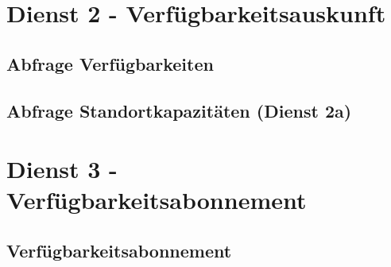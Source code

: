 \section{Dienst 2 - Verfügbarkeitsauskunft}
\label{sec:Nachrichten:Dienst2}

\subsection*{Abfrage Verfügbarkeiten}
\label{subsec:Nachrichten:Dienst2:Availability}



\medskip



\medskip


\subsection*{Abfrage Standortkapazitäten (Dienst 2a)}
\label{subsec:Nachrichten:Dienst2:PlaceAvailability}





\section{Dienst 3 - Verfügbarkeitsabonnement}
\label{sec:Nachrichten:Dienst3}

\subsection*{Verfügbarkeitsabonnement}
\label{subsec:Nachrichten:Dienst3:AvailabilitySubscription}



\medskip



% 

% 





